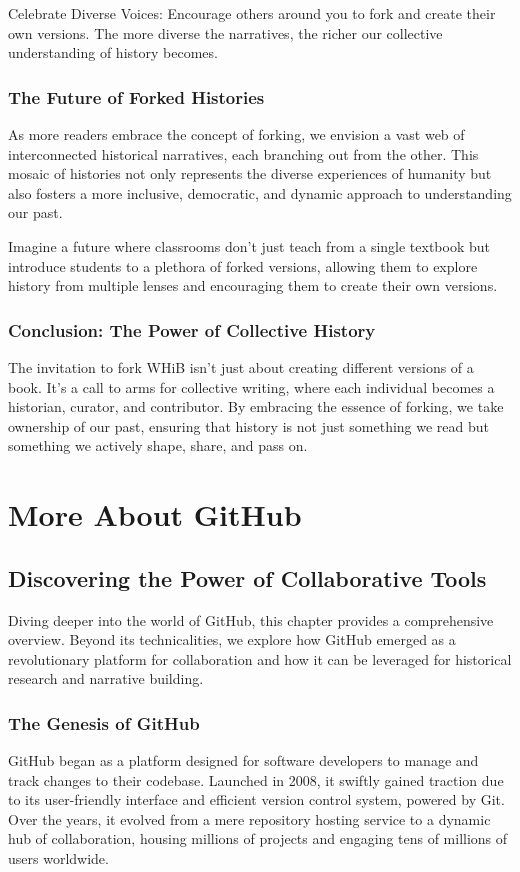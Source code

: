 \documentclass[a4paper,12pt]{book}
\begin{document}
Celebrate Diverse Voices: Encourage others around you to fork and create their own versions. The more diverse the narratives, the richer our collective understanding of history becomes.

\subsection*{The Future of Forked Histories}

As more readers embrace the concept of forking, we envision a vast web of interconnected historical narratives, each branching out from the other. This mosaic of histories not only represents the diverse experiences of humanity but also fosters a more inclusive, democratic, and dynamic approach to understanding our past.

Imagine a future where classrooms don't just teach from a single textbook but introduce students to a plethora of forked versions, allowing them to explore history from multiple lenses and encouraging them to create their own versions.

\subsection*{Conclusion: The Power of Collective History}

The invitation to fork WHiB isn't just about creating different versions of a book. It's a call to arms for collective writing, where each individual becomes a historian, curator, and contributor. By embracing the essence of forking, we take ownership of our past, ensuring that history is not just something we read but something we actively shape, share, and pass on.

\chapter{More About GitHub}
\section*{Discovering the Power of Collaborative Tools}
Diving deeper into the world of GitHub, this chapter provides a comprehensive overview. Beyond its technicalities, we explore how GitHub emerged as a revolutionary platform for collaboration and how it can be leveraged for historical research and narrative building.

\subsection*{The Genesis of GitHub}
GitHub began as a platform designed for software developers to manage and track changes to their codebase. Launched in 2008, it swiftly gained traction due to its user-friendly interface and efficient version control system, powered by Git. Over the years, it evolved from a mere repository hosting service to a dynamic hub of collaboration, housing millions of projects and engaging tens of millions of users worldwide.
\end{document}
